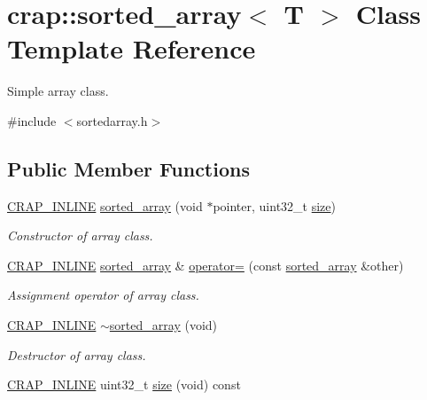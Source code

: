 \hypertarget{classcrap_1_1sorted__array}{\section{crap\+:\+:sorted\+\_\+array$<$ T $>$ Class Template Reference}
\label{classcrap_1_1sorted__array}
}


Simple array class.  




{\ttfamily \#include $<$sortedarray.\+h$>$}

\subsection*{Public Member Functions}
\begin{DoxyCompactItemize}
\item 
\hyperlink{config__x86_8h_a5a40526b8d842e7ff731509998bb0f1c}{C\+R\+A\+P\+\_\+\+I\+N\+L\+I\+N\+E} \hyperlink{classcrap_1_1sorted__array_a6807ec6612c2d57f275c29e37ee63e22}{sorted\+\_\+array} (void $\ast$pointer, uint32\+\_\+t \hyperlink{classcrap_1_1sorted__array_a296560cdb46c44a1aef6e06b122c10f5}{size})
\begin{DoxyCompactList}\small\item\em Constructor of array class. \end{DoxyCompactList}\item 
\hyperlink{config__x86_8h_a5a40526b8d842e7ff731509998bb0f1c}{C\+R\+A\+P\+\_\+\+I\+N\+L\+I\+N\+E} \hyperlink{classcrap_1_1sorted__array}{sorted\+\_\+array} \& \hyperlink{classcrap_1_1sorted__array_a5283ecb6e3f0d3515605e5d1f5f1d60b}{operator=} (const \hyperlink{classcrap_1_1sorted__array}{sorted\+\_\+array} \&other)
\begin{DoxyCompactList}\small\item\em Assignment operator of array class. \end{DoxyCompactList}\item 
\hyperlink{config__x86_8h_a5a40526b8d842e7ff731509998bb0f1c}{C\+R\+A\+P\+\_\+\+I\+N\+L\+I\+N\+E} \hyperlink{classcrap_1_1sorted__array_aae64790ce1bb794ad34a6c529a0d4c3a}{$\sim$sorted\+\_\+array} (void)
\begin{DoxyCompactList}\small\item\em Destructor of array class. \end{DoxyCompactList}\item 
\hyperlink{config__x86_8h_a5a40526b8d842e7ff731509998bb0f1c}{C\+R\+A\+P\+\_\+\+I\+N\+L\+I\+N\+E} uint32\+\_\+t \hyperlink{classcrap_1_1sorted__array_a296560cdb46c44a1aef6e06b122c10f5}{size} (void) const 

\end{DoxyCompactItemize}
